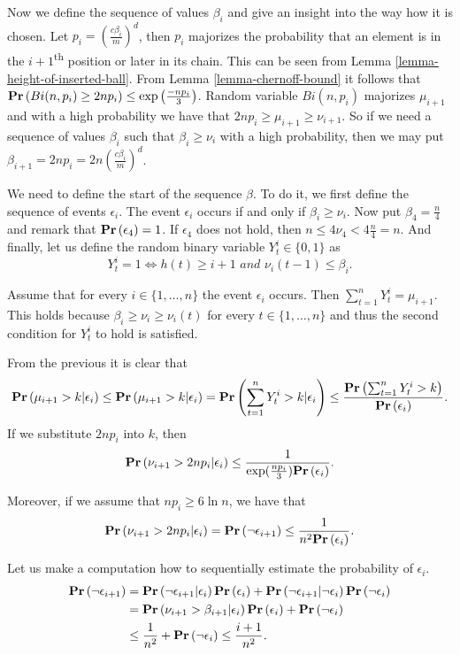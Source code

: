 Now we define the sequence of values $\beta_i$ and give an insight into the way how it is chosen. Let $p_i = \left(\frac{c\beta_i}{m}\right) ^ d$, then $p_i$ majorizes the probability that an element is in the $i + 1$\textsuperscript{th} position or later in its chain. This can be seen from Lemma \ref{lemma-height-of-inserted-ball}. From Lemma \ref{lemma-chernoff-bound} it follows that $\mathbf{Pr}\left(Bi(n, p_i) \geq 2np_i\right) \leq \exp\left(\frac{-np_i}{3}\right)$. Random variable $Bi(n, p_i)$ majorizes $\mu_{i + 1}$ and with a high probability we have that $2np_i \geq \mu_{i + 1} \geq \nu_{i + 1}$. So if we need a sequence of values $\beta_i$ such that $\beta_i \geq \nu_{i}$ with a high probability, then we may put $\beta_{i + 1} = 2np_i = 2n\left(\frac{c\beta_i}{m}\right) ^ d$.

We need to define the start of the sequence $\beta$. To do it, we first define the sequence of events $\epsilon_i$. The event $\epsilon_i$ occurs if and only if $\beta_i \geq \nu_i$. Now put $\beta_4 = \frac{n}{4}$ and remark that $\mathbf{Pr}\left(\epsilon_4\right) = 1$. If $\epsilon_4$ does not hold, then $n \leq 4 \nu_4 < 4 \frac{n}{4} = n$. And finally, let us define the random binary variable $Y_t^i \in \{0, 1\}$ as $$Y_t^i = 1 \Leftrightarrow h(t) \geq i + 1 \textit{ and } \nu_i(t - 1) \leq \beta_i \textit{.}$$

Assume that for every $i \in \{1, \dots, n\}$ the event $\epsilon_i$ occurs. Then $\displaystyle\sum_{t = 1}^{n} Y_t^i = \mu_{i + 1}$. This holds because $\beta_i \geq \nu_i \geq \nu_i(t)$ for every $t \in \{1, \dots, n\}$ and thus the second condition for $Y_t^i$ to hold is satisfied. 

From the previous it is clear that 
\[
\mathbf{Pr}\left(\mu_{i + 1} > k | \epsilon_i\right) \leq \mathbf{Pr}\left(\mu_{i + 1} > k | \epsilon_i\right) = \mathbf{Pr}\left(\displaystyle\sum_{t = 1}^{n} Y_t^{i} > k | \epsilon_i\right) \leq \frac{\mathbf{Pr}\left(\sum_{t = 1}^{n} Y_t^{i} > k\right)}{\mathbf{Pr}\left(\epsilon_i\right)}\textit{.}
\]
If we substitute $2np_i$ into $k$, then
\[
\mathbf{Pr}\left(\nu_{i + 1} > 2np_i | \epsilon_i\right) \leq \frac{1}{\exp(\frac{np_i}{3})\mathbf{Pr}\left(\epsilon_i\right)} \text{.}
\]

Moreover, if we assume that $np_i \geq 6 \ln n$, we have that 
\[
\mathbf{Pr}\left(\nu_{i + 1} > 2np_i | \epsilon_i\right) = \mathbf{Pr}\left(\neg \epsilon_{i + 1}\right) \leq \frac{1}{n ^ 2\mathbf{Pr}\left(\epsilon_i\right)} \textit{.}
\]

Let us make a computation how to sequentially estimate the probability of $\epsilon_i$.
\[
\begin{split}
\mathbf{Pr}\left(\neg \epsilon_{i + 1}\right) 
	& = \mathbf{Pr}\left(\neg \epsilon_{i + 1} | \epsilon_i\right)\mathbf{Pr}\left(\epsilon_i\right) + \mathbf{Pr}\left(\neg \epsilon_{i + 1} | \neg \epsilon_i\right)\mathbf{Pr}\left(\neg \epsilon_i\right) \\
	& = \mathbf{Pr}\left(\nu_{i + 1} > \beta_{i + 1} | \epsilon_i\right)\mathbf{Pr}\left(\epsilon_i\right) + \mathbf{Pr}\left(\neg \epsilon_i\right) \\
	& \leq \frac{1}{n ^ 2} + \mathbf{Pr}\left(\neg \epsilon_i\right) \leq \frac{i + 1}{n ^ 2} \textit{.}
\end{split} 
\]

